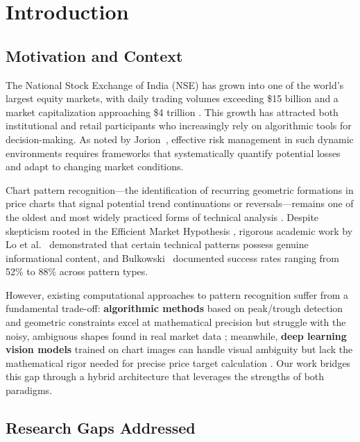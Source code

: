 \documentclass[12pt,a4paper]{article}
\begin{document}
\section{Introduction}

\subsection{Motivation and Context}

The National Stock Exchange of India (NSE) has grown into one of the world's largest equity markets, with daily trading volumes exceeding \$15 billion and a market capitalization approaching \$4 trillion \cite{sebi2024annual}. This growth has attracted both institutional and retail participants who increasingly rely on algorithmic tools for decision-making. As noted by Jorion~\cite{jorion2007value}, effective risk management in such dynamic environments requires frameworks that systematically quantify potential losses and adapt to changing market conditions.

Chart pattern recognition---the identification of recurring geometric formations in price charts that signal potential trend continuations or reversals---remains one of the oldest and most widely practiced forms of technical analysis \cite{murphy1999technical}. Despite skepticism rooted in the Efficient Market Hypothesis \cite{fama1970efficient}, rigorous academic work by Lo et al.~\cite{lo2000foundations} demonstrated that certain technical patterns possess genuine informational content, and Bulkowski~\cite{bulkowski2005encyclopedia} documented success rates ranging from 52\% to 88\% across pattern types.

However, existing computational approaches to pattern recognition suffer from a fundamental trade-off: \textbf{algorithmic methods} based on peak/trough detection and geometric constraints excel at mathematical precision but struggle with the noisy, ambiguous shapes found in real market data \cite{park2007technical}; meanwhile, \textbf{deep learning vision models} trained on chart images can handle visual ambiguity but lack the mathematical rigor needed for precise price target calculation \cite{tsantekidis2017forecasting}. Our work bridges this gap through a hybrid architecture that leverages the strengths of both paradigms.

\subsection{Research Gaps Addressed}
\end{document}
